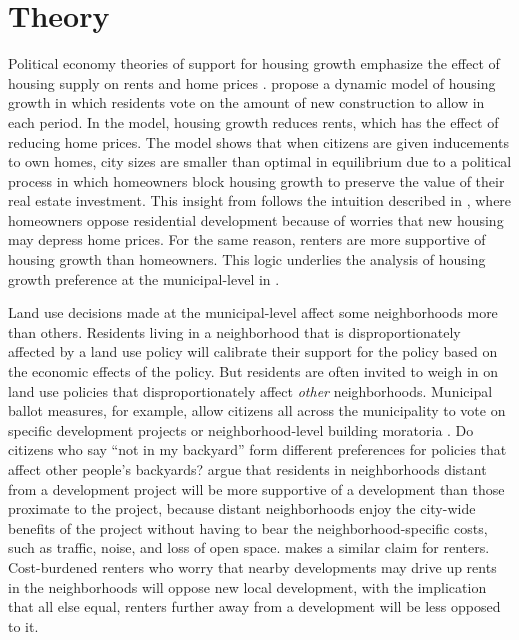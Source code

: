 \documentclass[article,11pt]{memoir}
\begin{document}
\section{Theory}\label{sec:theory}

Political economy theories of support for housing growth emphasize the effect of housing supply on rents and home prices \citep{fischel_homevoter_2001,hilber_origins_2013,ortalo-magne_political_2014}. \cite{ortalo-magne_political_2014} propose a dynamic model of housing growth in which residents vote on the amount of new construction to allow in each period. In the model, housing growth reduces rents, which has the effect of reducing home prices. The model shows that when citizens are given inducements to own homes, city sizes are smaller than optimal in equilibrium due to a political process in which homeowners block housing growth to preserve the value of their real estate investment. This insight from \cite{ortalo-magne_political_2014} follows the intuition described in \cite{fischel_homevoter_2001}, where homeowners oppose residential development because of worries that new housing may depress home prices. For the same reason, renters are more supportive of housing growth than homeowners. This logic underlies the analysis of housing growth preference at the municipal-level in \cite{hankinson_when_2018}.

Land use decisions made at the municipal-level affect some neighborhoods more than others. Residents living in a neighborhood that is disproportionately affected by a land use policy will calibrate their support for the policy based on the economic effects of the policy. But residents are often invited to weigh in on land use policies that disproportionately affect \emph{other} neighborhoods. Municipal ballot measures, for example, allow citizens all across the municipality to vote on specific development projects or neighborhood-level building moratoria \citep{gerber_development_2003,hankinson_when_2018}. Do citizens who say ``not in my backyard'' form different preferences for policies that affect other people's backyards? \cite{gerber_development_2003} argue that residents in neighborhoods distant from a development project will be more supportive of a development than those proximate to the project, because distant neighborhoods enjoy the city-wide benefits of the project without having to bear the neighborhood-specific costs, such as traffic, noise, and loss of open space. \cite{hankinson_when_2018} makes a similar claim for renters. Cost-burdened renters who worry that nearby developments may drive up rents in the neighborhoods will oppose new local development, with the implication that all else equal, renters further away from a development will be less opposed to it.
\end{document}
